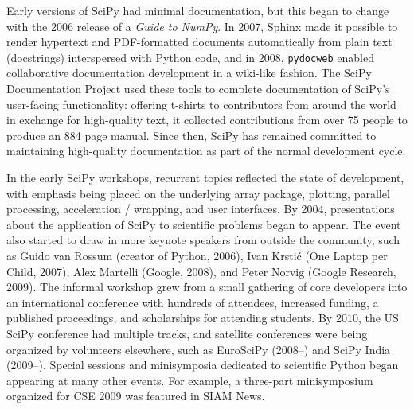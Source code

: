 \documentclass[fleqn,10pt]{wlscirep}
\begin{document}
Early versions of SciPy had minimal documentation, but this began to change
with the 2006 release of a \emph{Guide to NumPy}\cite{oliphant2006guide}.
In 2007, Sphinx\cite{sphinx} made it possible to render hypertext and
PDF-formatted documents automatically from plain text (docstrings)
interspersed with Python code, and in 2008, \texttt{pydocweb}\cite{pydocweb}
enabled collaborative documentation development in a wiki-like fashion.
The SciPy Documentation Project \cite{vanderwalt2008scipy, harrington2008scipy}
used these tools to complete documentation of SciPy's user-facing
functionality: offering t-shirts to contributors from around the world in
exchange for high-quality text, it collected contributions from over 75 people
to produce an 884 page manual\cite{harrington2009scipy}. Since then,
SciPy has remained committed to maintaining high-quality documentation as
part of the normal development cycle.


In the early SciPy workshops, recurrent topics reflected the state of development, with
emphasis being placed on the underlying array package, plotting,
parallel processing, acceleration / wrapping, and user interfaces.  By
2004, presentations about the application of SciPy to scientific problems
began to appear.  The event also started to draw in more keynote
speakers from outside the community, such as Guido van Rossum (creator
of Python, 2006), Ivan Krstić (One Laptop per Child, 2007), Alex
Martelli (Google, 2008), and Peter Norvig (Google Research, 2009).
The informal workshop grew from a small gathering of core developers into an
international conference with hundreds of attendees, increased funding, a
published proceedings, and scholarships for attending students.
By 2010, the US SciPy conference had multiple tracks, and satellite
conferences were being organized by volunteers elsewhere, such as EuroSciPy
(2008–) and SciPy India (2009–).
Special sessions and minisymposia dedicated to scientific Python began
appearing at many other events.
For example, a three-part minisymposium organized for CSE 2009 was
featured in SIAM News\cite{siamcse09}.
\end{document}
